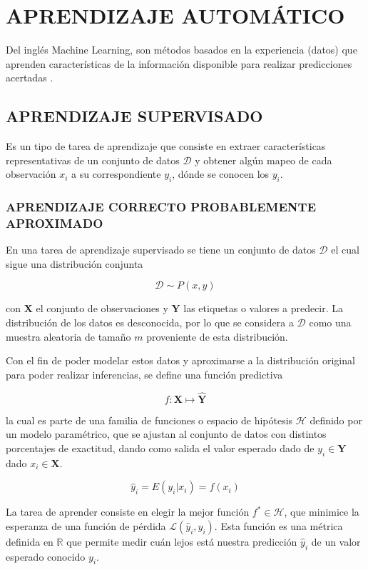 \section{APRENDIZAJE AUTOMÁTICO}
    Del inglés Machine Learning, son métodos basados en la experiencia (datos) que aprenden características de la información disponible para realizar predicciones acertadas \citep{10.5555/3360093}.
    \subsection{APRENDIZAJE SUPERVISADO}
        Es un tipo de tarea de aprendizaje que consiste en extraer características representativas de un conjunto de datos $\mathcal{D}$ y obtener algún mapeo de cada observación $x_i$ a su correspondiente $y_i$, dónde se conocen los $y_i$.
    
        \subsubsection{APRENDIZAJE CORRECTO PROBABLEMENTE APROXIMADO}
        En una tarea de aprendizaje supervisado se tiene un conjunto de datos $\mathcal{D}$ el cual sigue una distribución conjunta
        
        $$\mathcal{D} \sim P(x, y)$$
        
        \noindent con $\mathbf{X}$ el conjunto de observaciones y $\mathbf{Y}$ las etiquetas o valores a predecir. La distribución de los datos es desconocida, por lo que se considera a $\mathcal{D}$ como una muestra aleatoria de tamaño $m$ proveniente de esta distribución.
        
        Con el fin de poder modelar estos datos y aproximarse a la distribución original para poder realizar inferencias, se define una función predictiva
        
        $$f: \mathbf{X} \mapsto \mathbf{\hat{Y}}$$
        
        \noindent la cual es parte de una familia de funciones o espacio de hipótesis $\mathcal{H}$ definido por un modelo paramétrico, que se ajustan al conjunto de datos con distintos porcentajes de exactitud, dando como salida el valor esperado dado de $y_i \in \mathbf{Y}$ dado $x_i \in \mathbf{X}$.
        
        $$\hat{y}_i = E(y_i|x_i) = f(x_i)$$
        
        La tarea de aprender consiste en elegir la mejor función $f^* \in \mathcal{H}$, que minimice la esperanza de una función de pérdida $\mathcal{L}(\hat{y}_i, y_i)$. Esta función es una métrica definida en $\mathbb{R}$ que permite medir cuán lejos está nuestra predicción $\hat{y}_i$ de un valor esperado conocido $y_i$.
        
